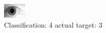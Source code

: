 \begin{figure}[h!]
\begin{center}
\includegraphics[width=0.60\columnwidth]{figures/ID1877_class_4_target_3.png}
\end{center}
\caption{ Classification: 4 actual target: 3}
\label{fig:ID1877_class_4_target_3}
\end{figure}
